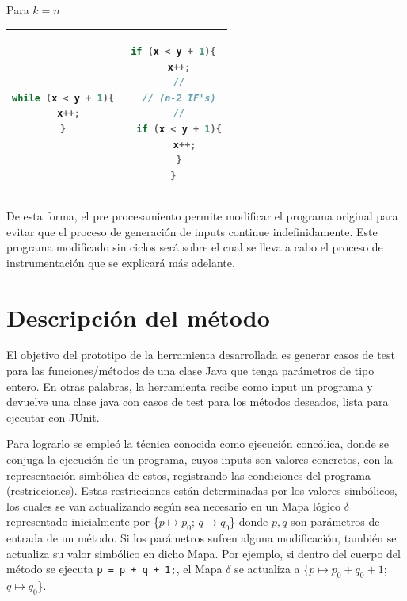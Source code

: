 \documentclass{llncs}
\begin{document}
Para \(k = n\)
\begin{table}
\centering
\begin{tabular}{|c | c|}
\hline
\begin{lstlisting}[language=Java]
while (x < y + 1){
  x++;
}
\end{lstlisting} & 
\begin{lstlisting}[language=Java]
if (x < y + 1){
  x++;
  //
  // (n-2 IF's)
  //
  if (x < y + 1){
    x++;
  }
}
\end{lstlisting}\\
\hline
\end{tabular}
\end{table}

De esta forma, el pre procesamiento permite modificar el programa original para evitar que el proceso de generación de inputs continue indefinidamente.
Este programa modificado sin ciclos será sobre el cual se lleva a cabo el proceso de instrumentación que se explicará más adelante.


\section{Descripción del método}
El objetivo del prototipo de la herramienta desarrollada es generar casos de test para las funciones/métodos de una clase Java que tenga parámetros de tipo
entero. En otras palabras, la herramienta recibe como input un programa y devuelve una clase java con casos de test para los métodos deseados, lista para ejecutar con JUnit.

Para lograrlo se empleó la técnica conocida como ejecución concólica, donde se conjuga la ejecución de un programa, cuyos inputs son valores concretos,
con la representación simbólica de estos, registrando las condiciones del programa (restricciones). Estas restricciones están determinadas por los valores simbólicos,
los cuales se van actualizando según sea necesario en un Mapa lógico $\delta$ representado inicialmente por \{$p \mapsto p_0$; $q \mapsto q_0$\}
donde $p,q$ son parámetros de entrada de un método. Si los parámetros sufren alguna modificación, también se actualiza su valor simbólico en dicho Mapa.
Por ejemplo, si dentro del cuerpo del método se ejecuta \texttt{p = p + q + 1;}, el Mapa $\delta$ se actualiza a \{$p \mapsto p_0 + q_0 + 1$; $q \mapsto q_0$\}.
\end{document}
